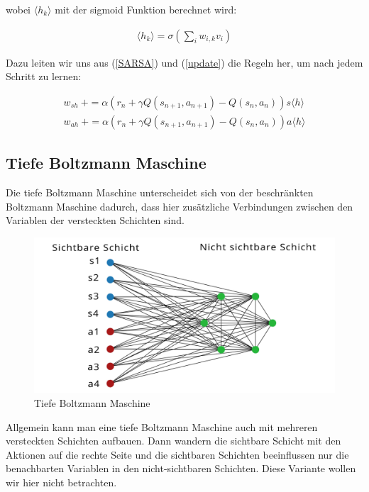 wobei $\langle h_k \rangle$ mit der sigmoid Funktion berechnet wird:

\begin{align*}
	\langle h_k \rangle = \sigma (\sum_{i}w_{i,k}v_i)
\end{align*}

Dazu leiten wir uns aus (\ref{SARSA}) und (\ref{update}) die Regeln her, um nach jedem Schritt zu lernen:

\begin{align*}
	w_{sh} \:+= \alpha ( r_n + \gamma Q(s_{n+1}, a_{n+1}) -  Q(s_n, a_n) ) s \langle h \rangle \\
	w_{ah} \: += \alpha ( r_n + \gamma Q(s_{n+1}, a_{n+1}) -  Q(s_n, a_n) ) a \langle h \rangle
\end{align*}

\subsection{Tiefe Boltzmann Maschine}
\label{subsec:dbm}

Die tiefe Boltzmann Maschine unterscheidet sich von der beschränkten Boltzmann Maschine dadurch, dass hier zusätzliche Verbindungen zwischen den Variablen der versteckten Schichten sind.

\begin{figure}[hbt!]
\centering
\includegraphics[width=\textwidth]{Figures/dbm.png}
\caption{Tiefe Boltzmann Maschine}
\label{police}
\end{figure}

Allgemein kann man eine tiefe Boltzmann Maschine auch mit mehreren versteckten Schichten aufbauen. Dann wandern die sichtbare Schicht mit den Aktionen auf die rechte Seite und die sichtbaren Schichten beeinflussen nur die benachbarten Variablen in den nicht-sichtbaren Schichten. Diese Variante wollen wir hier nicht betrachten.

